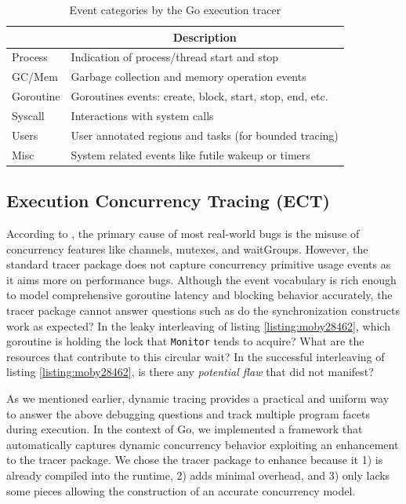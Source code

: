 \begin{table}[]
    \centering
        \begin{tabular}{|l|l|}
        \hline
        \rowcolor[HTML]{C0C0C0}
        \multicolumn{1}{|c|}{\cellcolor[HTML]{C0C0C0}\textbf{Category}} & \multicolumn{1}{c|}{\cellcolor[HTML]{C0C0C0}\textbf{Description}} \\ \hline
        Process & Indication of process/thread start and stop \\ \hline
        GC/Mem & Garbage collection and memory operation events\\ \hline
        Goroutine & Goroutines events: create, block, start, stop, end, etc. \\ \hline
        Syscall & Interactions with system calls \\ \hline
        Users & User annotated regions and tasks (for bounded tracing) \\ \hline
        Misc & System related events like futile wakeup or timers \\ \hline
        \end{tabular}

    \caption{Event categories by the Go execution tracer}
    \label{tab:events}
\end{table}




\subsection{Execution Concurrency Tracing (ECT)}
\label{sec:ect}
According to \cite{tu-concurrentBugs-asplos19,yuan-gobench-cgo21}, the primary cause of most real-world bugs is the misuse of concurrency features like channels, mutexes, and waitGroups.
%
However, the standard tracer package does not capture concurrency primitive usage events as it aims more on performance bugs.
%
Although the event vocabulary is rich enough to model comprehensive goroutine latency and blocking behavior accurately, the tracer package cannot answer questions such as do the synchronization constructs work as expected? In the leaky interleaving of listing \ref{listing:moby28462}, which goroutine is holding the lock that \texttt{Monitor} tends to acquire? What are the resources that contribute to this circular wait? In the successful interleaving of listing \ref{listing:moby28462}, is there any \textit{potential flaw} that did not manifest?

%
As we mentioned earlier, dynamic tracing provides a practical and uniform way to answer the above debugging questions and track multiple program facets during execution.
%
In the context of Go, we implemented a framework that automatically captures dynamic concurrency behavior exploiting an enhancement to the tracer package.
%
We chose the tracer package to enhance because it 1) is already compiled into the runtime, 2) adds minimal overhead, and 3) only lacks some pieces allowing the construction of an accurate concurrency model.
%

